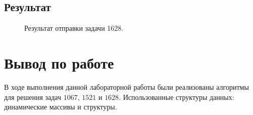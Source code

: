 \documentclass[a5paper, 10pt]{article}
\theoremstyle{definition}
\theoremstyle{plain}
\theoremstyle{remark}
\begin{document}
\subsection{Результат}
\begin{figure}[h!]
\caption{Результат отправки задачи 1628.}
\end{figure}



\newpage
\section{Вывод по работе}
В ходе выполнения данной лабораторной работы были реализованы алгоритмы для решения задач $1067$, $1521$ и $1628$. Использованные структуры данных: динамические массивы и структуры.
\end{document}
